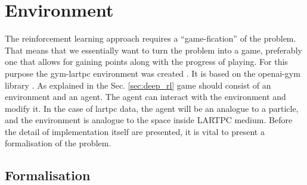 






\section{Environment}

The reinforcement learning approach requires a ``game-fication'' of the problem.
That means that we essentially want to turn the problem into a game, preferably one that allows for gaining points along with the progress of playing.
For this purpose the gym-lartpc environment was created \cite{gymlartpc}.
It is based on the openai-gym library \cite{openaigym}.
As explained in the Sec. \ref{sec:deep_rl} game should consist of an environment and an agent.
The agent can interact with the environment and modify it.
In the case of lartpc data, the agent will be an analogue to a particle, and the environment is analogue to the space inside LARTPC medium.
Before the detail of implementation itself are presented, it is vital to present a formalisation of the problem.

\subsection{Formalisation}

